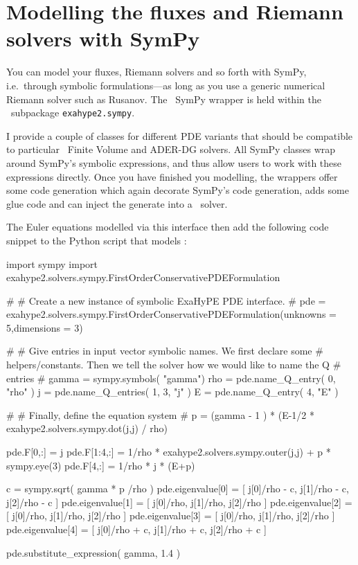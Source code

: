 \section{Modelling the fluxes and Riemann solvers with SymPy}

You can model your fluxes, Riemann solvers and so forth with SymPy, 
i.e.~through symbolic formulations---as long as you use a generic numerical
Riemann solver such as Rusanov.
The \ExaHyPE\ SymPy wrapper is
held within the \ExaHyPE\ subpackage \texttt{exahype2.sympy}.


I provide a couple of classes for different PDE variants that should be
compatible to particular \ExaHyPE\ Finite Volume and ADER-DG solvers.
All SymPy classes wrap around SymPy's symbolic expressions, and thus allow users
to work with these expressions directly.
Once you have finished you modelling, the wrappers offer some code generation
which again decorate SymPy's code generation, adds some glue code and can inject
the generate into a \Peano\ solver.


The Euler equations modelled via this interface then add the following code
snippet to the Python script that models \Peano:

\begin{code}
import sympy
import exahype2.solvers.sympy.FirstOrderConservativePDEFormulation


#
# Create a new instance of symbolic ExaHyPE PDE interface.
#
pde = exahype2.solvers.sympy.FirstOrderConservativePDEFormulation(unknowns = 5,dimensions = 3)

#
# Give entries in input vector symbolic names. We first declare some
# helpers/constants. Then we tell the solver how we would like to name the Q 
# entries
#
gamma = sympy.symbols( "gamma")
rho   = pde.name_Q_entry( 0, "rho" )
j     = pde.name_Q_entries( 1, 3, "j" )
E     = pde.name_Q_entry( 4, "E" )

#
# Finally, define the equation system
#
p = (gamma - 1 ) * (E-1/2 * exahype2.solvers.sympy.dot(j,j) / rho)

pde.F[0,:]   = j
pde.F[1:4,:] = 1/rho * exahype2.solvers.sympy.outer(j,j) + p * sympy.eye(3)
pde.F[4,:]   = 1/rho * j * (E+p)

c = sympy.sqrt( gamma * p /rho )
pde.eigenvalue[0] = [ j[0]/rho - c, j[1]/rho - c, j[2]/rho - c ]
pde.eigenvalue[1] = [ j[0]/rho, j[1]/rho, j[2]/rho ]
pde.eigenvalue[2] = [ j[0]/rho, j[1]/rho, j[2]/rho ]
pde.eigenvalue[3] = [ j[0]/rho, j[1]/rho, j[2]/rho ]
pde.eigenvalue[4] = [ j[0]/rho + c, j[1]/rho + c, j[2]/rho + c ]

pde.substitute_expression( gamma, 1.4 )
\end{code}


